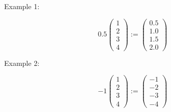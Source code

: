 \begin{frame}

    Example 1:

    \begin{equation*}
        0.5 
        \left(
        \begin{array}{c}
            1 \\
            2 \\
            3 \\
            4
        \end{array}
        \right)
        :=
        \left(
        \begin{array}{c}
            0.5 \\
            1.0 \\
            1.5 \\
            2.0 
        \end{array}
        \right)
    \end{equation*}

    Example 2:

    \begin{equation*}
        -1
        \left(
        \begin{array}{c}
            1 \\
            2 \\
            3 \\
            4
        \end{array}
        \right)
        :=
        \left(
        \begin{array}{c}
            -1 \\
            -2 \\
            -3 \\
            -4
        \end{array}
        \right)
    \end{equation*}
\end{frame}

